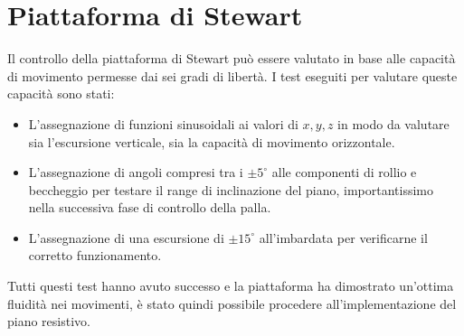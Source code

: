 \documentclass[12pt,twoside,openright]{report}
\begin{document}
\section{Piattaforma di Stewart}\label{resultstewart}
Il controllo della piattaforma di Stewart può essere valutato in base alle capacità di movimento permesse dai sei gradi di libertà. I test eseguiti per valutare queste capacità sono stati:
\begin{itemize}
\item L'assegnazione di funzioni sinusoidali ai valori di $x,y,z$ in modo da valutare sia l'escursione verticale, sia la capacità di movimento orizzontale.
\item L'assegnazione di angoli compresi tra i $\pm 5^\circ$ alle componenti di rollio e beccheggio per testare il range di inclinazione del piano, importantissimo nella successiva fase di controllo della palla.
\item L'assegnazione di una escursione di $\pm 15^\circ$ all'imbardata per verificarne il corretto funzionamento.
\end{itemize}
Tutti questi test hanno avuto successo e la piattaforma ha dimostrato un'ottima fluidità nei movimenti, è stato quindi possibile procedere all'implementazione del piano resistivo.
\end{document}
